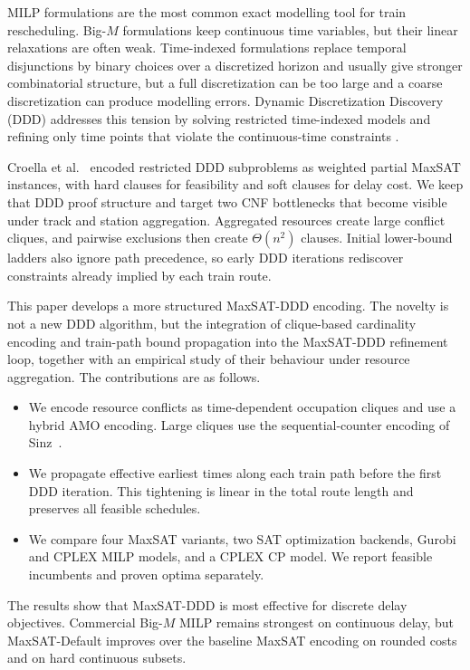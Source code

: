 \documentclass[runningheads]{llncs}
\begin{document}
MILP formulations are the most common exact modelling tool for train
rescheduling. Big-$M$ formulations keep continuous time variables, but their
linear relaxations are often weak. Time-indexed formulations replace temporal
disjunctions by binary choices over a discretized horizon and usually give
stronger combinatorial structure, but a full discretization can be too large and
a coarse discretization can produce modelling errors. Dynamic Discretization
Discovery (DDD) addresses this tension by solving restricted time-indexed
models and refining only time points that violate the continuous-time
constraints \cite{Boland2017}.

Croella et al.~\cite{Croella2024} encoded restricted DDD subproblems as
weighted partial MaxSAT instances, with hard clauses for feasibility and soft
clauses for delay cost. We keep that DDD proof structure and target two CNF
bottlenecks that become visible under track and station aggregation. Aggregated
resources create large conflict cliques, and pairwise exclusions then create
$\Theta(n^2)$ clauses. Initial lower-bound ladders also ignore path precedence,
so early DDD iterations rediscover constraints already implied by each train
route.

This paper develops a more structured MaxSAT-DDD encoding. The novelty is not a
new DDD algorithm, but the integration of clique-based cardinality encoding and
train-path bound propagation into the MaxSAT-DDD refinement loop, together with
an empirical study of their behaviour under resource aggregation. The contributions
are as follows.

\begin{itemize}
\item We encode resource conflicts as time-dependent occupation cliques and use
a hybrid AMO encoding. Large cliques use the sequential-counter encoding of
Sinz~\cite{Sinz2005}.
\item We propagate effective earliest times along each train path before the
first DDD iteration. This tightening is linear in the total route length and
preserves all feasible schedules.
\item We compare four MaxSAT variants, two SAT optimization backends, Gurobi
and CPLEX MILP models, and a CPLEX CP model. We report feasible incumbents and
proven optima separately.
\end{itemize}

The results show that MaxSAT-DDD is most effective for discrete delay
objectives. Commercial Big-$M$ MILP remains strongest on continuous delay, but
MaxSAT-Default improves over the baseline MaxSAT encoding on rounded costs and
on hard continuous subsets.
\end{document}
